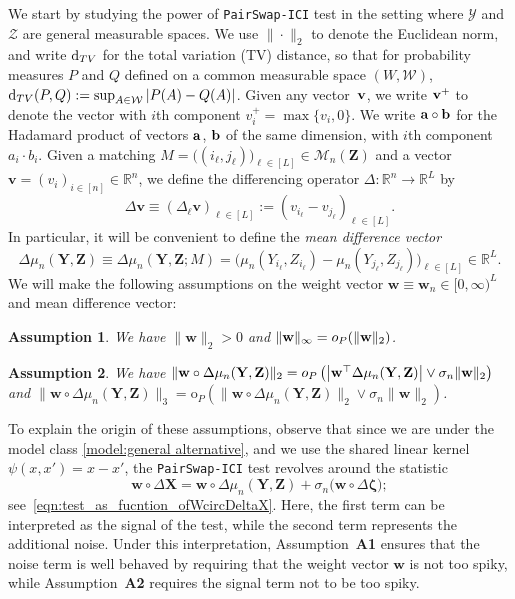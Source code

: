 \documentclass[12pt]{article}
\newtheorem{assumption}{Assumption}
\newcommand{\R}{\mathbb{R}}
\newcommand{\eps}{\varepsilon}
\newcommand{\bX}{\mathbf{X}}
\newcommand{\bY}{\mathbf{Y}}
\newcommand{\bZ}{\mathbf{Z}}
\newcommand{\bw}{\mathbf{w}}
\newcommand{\bv}{\mathbf{v}}
\newcommand{\bzeta}{\mathbf{\eps}}
\def\bzeta{{\boldsymbol{\zeta}}}
\begin{document}
We start by studying the power of \texttt{PairSwap-ICI} test in the setting where $\mathcal{Y}$ and $\mathcal{Z}$ are general measurable spaces. We use $\|\cdot\|_2$ to denote the Euclidean norm, and write $\mathrm{d}_{\rm TV}$ for the total variation (TV) distance, so that for probability measures $P$ and $Q$ defined on a common measurable space $(W,\mathcal{W})$, $\mathrm{d}_{\rm TV}(P,Q) :=\sup_{A \in \mathcal{W}}|P(A)-Q(A)|$.  Given any vector~$\bf{v}$, we write $\bf{v}^+$ to denote the vector with $i$th component $v_{i}^{+} =\max\{v_i,0\}$. We write $\bf{a}\circ \bf{b}$ for the Hadamard product of vectors $\bf{a}$, $\bf{b}$ of the same dimension, with $i$th component $a_i\cdot b_i$.
Given a matching $M= \bigl((i_\ell,j_\ell)\bigr)_{\ell \in [L]} \in \mathcal{M}_n(\bZ)$ and a vector $\bv = (v_i)_{i \in [n]} \in \mathbb{R}^n$, we define the differencing operator $\Delta:\mathbb{R}^n \rightarrow \mathbb{R}^L$ by
\[
\Delta \bv \equiv (\Delta_\ell \bv)_{\ell \in [L]} := (v_{i_\ell} - v_{j_\ell})_{\ell \in [L]}.
\]
In particular, it will be convenient to define the \emph{mean difference vector}
\[
\Delta \mu_n(\bY,\bZ) \equiv \Delta \mu_n(\bY,\bZ;M) = \bigl(\mu_n(Y_{i_\ell},Z_{i_\ell})-\mu_n(Y_{j_\ell},Z_{j_\ell})\bigr)_{\ell \in [L]} \in \R^L.
\]
We will make the following assumptions on the weight vector $\bw \equiv \bw_n \in [0,\infty)^L$ and mean difference vector:
\begin{assumption}\label{A1}
    We have $\|\bw\|_2 > 0$
     and $\|\bw\|_\infty = {\rm o}_P(\|\bw\|_2)$.
    \end{assumption}
    \begin{assumption}\label{A2}
    We have $\|\bw\circ\Delta\mu_n(\bY,\bZ)\|_2 = {\rm o}_P\left( \big|\bw^\top \Delta \mu_n(\bY,\bZ)\big|\vee\sigma_n\|\bw\|_2\right)$ and $\|\bw\circ\Delta\mu_n(\bY,\bZ)\|_3 = \mathrm{o}_P\left(\|\bw\circ\Delta\mu_n(\bY,\bZ)\|_2\vee\sigma_n\|\bw\|_2\right)$.
    \end{assumption}
    To explain the origin of these assumptions, observe that since we are under the model class \eqref{model:general alternative}, and we use the shared linear kernel $\psi(x,x')=x-x'$, the \textnormal{\texttt{PairSwap-ICI}} test revolves around the statistic 
    \[
\bw\circ\Delta\bX=\bw\circ\Delta\mu_n(\bY,\bZ)+\sigma_n\bigl(\bw\circ\Delta\bzeta\bigr);
    \]
    see~\eqref{eqn:test_as_fucntion_ofWcircDeltaX}.  Here, the first term can be interpreted as the signal of the test, while the second term represents the additional noise. Under this interpretation, Assumption~\textbf{A1} ensures that the noise term is well behaved by requiring that the weight vector $\bw$ is not too spiky, while Assumption~\textbf{A2} requires the signal term not to be too spiky.
\end{document}
